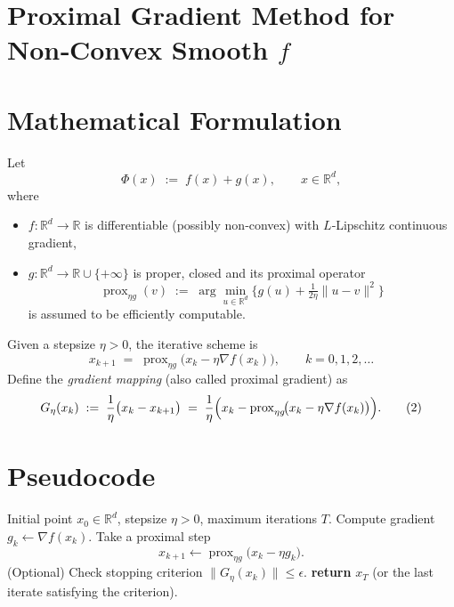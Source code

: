 \documentclass{article}
\begin{document}
\section*{Proximal Gradient Method for Non‑Convex Smooth $f$}

\section*{Mathematical Formulation}
Let 
\[
\Phi(x)\;:=\;f(x)+g(x),\qquad x\in\mathbb{R}^{d},
\]
where 
\begin{itemize}[nosep]
  \item $f:\mathbb{R}^{d}\!\to\!\mathbb{R}$ is differentiable (possibly non‑convex) with $L$‑Lipschitz continuous gradient,
  \item $g:\mathbb{R}^{d}\!\to\!\mathbb{R}\cup\{+\infty\}$ is proper, closed and its proximal operator
  \[
  \operatorname{prox}_{\eta g}(v)
  \;:=\;
  \arg\min_{u\in\mathbb{R}^{d}}\Big\{g(u)+\tfrac{1}{2\eta}\|u-v\|^{2}\Big\}
  \]
  is assumed to be efficiently computable.
\end{itemize}
Given a stepsize $\eta>0$, the iterative scheme is
\begin{equation}
\boxed{\;
x_{k+1}
\;=\;
\operatorname{prox}_{\eta g}\!\bigl(x_{k}-\eta\nabla f(x_{k})\bigr),
\qquad k=0,1,2,\dots
\;}
\tag{1}
\end{equation}
Define the \emph{gradient mapping} (also called proximal gradient) as
\begin{equation}
G_{\eta}(x_{k})
\;:=\;
\frac{1}{\eta}\bigl(x_{k}-x_{k+1}\bigr)
\;=\;
\frac{1}{\eta}\Bigl(x_{k}
-\operatorname{prox}_{\eta g}\!\bigl(x_{k}-\eta\nabla f(x_{k})\bigr)\Bigr).
\tag{2}
\end{equation}

\section*{Pseudocode}
\begin{algorithm}[h]
\caption{Proximal Gradient Method (PGM)}\label{alg:pgm}
\begin{algorithmic}[1]
\Require Initial point $x_{0}\in\mathbb{R}^{d}$, stepsize $\eta>0$, maximum iterations $T$.
    \State Compute gradient $g_{k}\gets\nabla f(x_{k})$.
    \State Take a proximal step 
    \[
    x_{k+1}\gets\operatorname{prox}_{\eta g}\bigl(x_{k}-\eta g_{k}\bigr).
    \]
    \State (Optional) Check stopping criterion 
    $\|G_{\eta}(x_{k})\| \le \epsilon$.
\EndFor
\State \textbf{return} $x_{T}$ (or the last iterate satisfying the criterion).
\end{algorithmic}
\end{algorithm}
\end{document}
